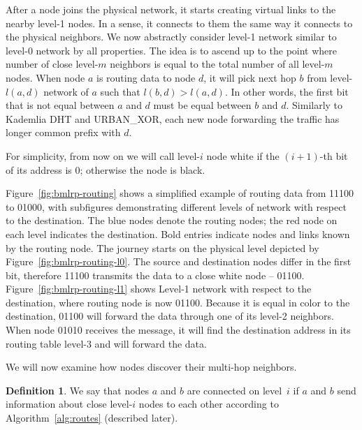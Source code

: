 \documentclass[14pt]{extarticle}
\theoremstyle{definition}
\newtheorem{defn}{Definition}
\newcommand{\urbanxor}{URBAN\_XOR}
\begin{document}
After a node joins the physical network, it starts creating virtual links to the nearby level-1 nodes. In a sense, it connects to them the same way it connects to the physical neighbors. We now abstractly consider level-1 network similar to level-0 network by all properties. The idea is to ascend up to the point where number of close level-$m$ neighbors is equal to the total number of all level-$m$ nodes. When node $a$ is routing data to node $d$, it will pick next hop $b$ from level-$l(a,d)$ network of $a$ such that $l(b,d) > l(a,d)$. In other words, the first bit that is not equal between $a$ and $d$ must be equal between $b$ and $d$. Similarly to Kademlia DHT and \urbanxor, each new node forwarding the traffic has longer common prefix with $d$.

For simplicity, from now on we will call level-$i$ node white if the $(i+1)$-th bit of its address is 0; otherwise the node is black.

Figure~\ref{fig:bmlrp-routing} shows a simplified example of routing data from 11100 to 01000, with subfigures demonstrating different levels of network with respect to the destination. The blue nodes denote the routing nodes; the red node on each level indicates the destination. Bold entries indicate nodes and links known by the routing node. The journey starts on the physical level depicted by Figure~\ref{fig:bmlrp-routing-l0}. The source and destination nodes differ in the first bit, therefore 11100 transmits the data to a close white node -- 01100. Figure~\ref{fig:bmlrp-routing-l1} shows Level-1 network with respect to the destination, where routing node is now 01100. Because it is equal in color to the destination, 01100 will forward the data through one of its level-2 neighbors. When node 01010 receives the message, it will find the destination address in its routing table level-3 and will forward the data.



We will now examine how nodes discover their multi-hop neighbors.

\begin{defn}
    We say that nodes $a$ and $b$ are connected on level~$i$ if $a$ and $b$ send information about close level-$i$ nodes to each other according to Algorithm~\ref{alg:routes} (described later).
    
    \label{defn:connected}
\end{defn}
\end{document}
